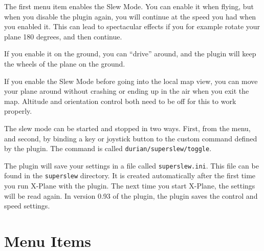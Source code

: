 \documentclass[a4paper,12pt]{article}
\begin{document}
The first menu item enables the Slew Mode. You can enable it when
flying, but when you disable the plugin again, you will continue at
the speed you had when you enabled it. This can lead to spectacular
effects if you for example rotate your plane 180 degrees, and then
continue. 

If you enable it on the ground, you can ``drive'' around, and the
plugin will keep the wheels of the plane on the ground.

If you enable the Slew Mode before going into the local map view, you
can move your plane around without crashing or ending up in the air
when you exit the map. Altitude and orientation control both need to be off for
this to work properly.

The slew mode can be started and stopped in two ways. First, from the
menu, and second, by binding a key or joystick button to the custom command
defined by the plugin. The command is called
\texttt{durian/superslew/toggle}. 

The plugin will save your settings in a file called \texttt{superslew.ini}. This
file can be found in the \texttt{superslew} directory. It is created
automatically after the first time you run X-Plane with the plugin. The next
time you start X-Plane, the settings will be read again. In version 0.93 of the
plugin, the plugin saves the control and speed settings.

\vspace{\baselineskip}
\section*{Menu Items}
\end{document}
